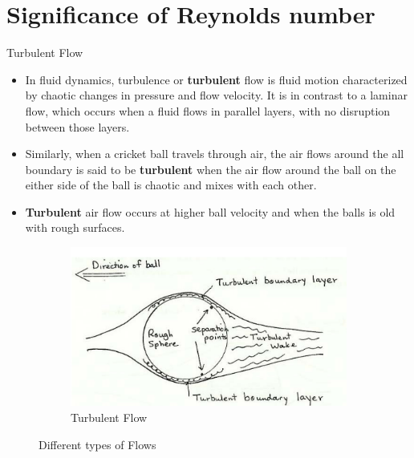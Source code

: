 \documentclass{beamer}
\begin{document}
\section{Significance of Reynolds number}
\begin{frame}{Turbulent Flow}
    \begin{itemize}
    \item 
    In fluid dynamics, turbulence or \textbf{turbulent} flow is fluid motion characterized by chaotic changes in pressure and flow velocity. It is in contrast to a laminar flow, which occurs when a fluid flows in parallel layers, with no disruption between those layers.
    
    \item
    Similarly, when a cricket ball travels through air, the  air flows around the all boundary is said to be \textbf{turbulent} when the air flow around the ball  on the either side of the ball is chaotic and mixes with each other. 
    \item
     \textbf{Turbulent} air flow occurs at higher ball velocity and when the balls is old with rough surfaces.
  \end{itemize}
\begin{figure}[h!]
  \centering
  \begin{subfigure}[b]{0.4\linewidth}
    \includegraphics[width=\linewidth]{./figs/turbulant.png}
    \caption{Turbulent Flow}
  \end{subfigure}
  \caption{Different types of Flows}
  \label{fig:drag1}
\end{figure}
  
  
\end{frame} 
\end{document}
